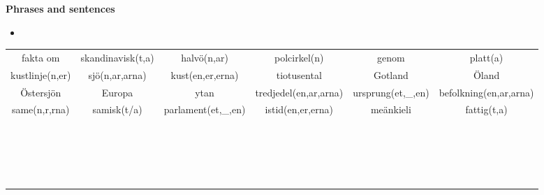 
\begin{flushleft}
    \textbf{Phrases and sentences}
    \begin{itemize}
        \item 
    \end{itemize}
\end{flushleft}

\begin{center}
    \begin{adjustwidth}{-2.45cm}{}
        \begin{tabular}{|c c c c c c|}
            \hline
            fakta om & skandinavisk(t,a) & halvö(n,ar) & polcirkel(n) & genom & platt(a) \\
            kustlinje(n,er) & sjö(n,ar,arna) & kust(en,er,erna) & tiotusental & Gotland & Öland \\
            Östersjön & Europa & ytan & tredjedel(en,ar,arna) & ursprung(et,\_,en) & befolkning(en,ar,arna) \\
            same(n,r,rna) & samisk(t/a) & parlament(et,\_,en) & istid(en,er,erna) & meänkieli & fattig(t,a) \\
             &  &  &  &  &  \\
             &  &  &  &  &  \\
             &  &  &  &  &  \\
             &  &  &  &  &  \\
             &  &  &  &  &  \\
             &  &  &  &  &  \\
             &  &  &  &  &  \\
             &  &  &  &  &  \\
             &  &  &  &  &  \\
             &  &  &  &  &  \\
             &  &  &  &  &  \\
             &  &  &  &  &  \\
             &  &  &  &  &  \\
             &  &  &  &  &  \\
             &  &  &  &  &  \\
             &  &  &  &  &  \\
             &  &  &  &  &  \\
             &  &  &  &  &  \\
             &  &  &  &  &  \\

\end{tabular}
\end{adjustwidth}
\end{center}
